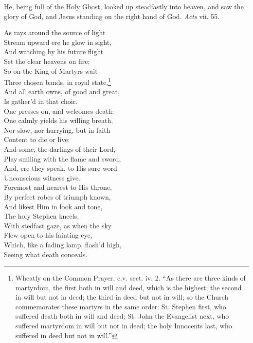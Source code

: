 
He, being full of the Holy Ghost, looked up steadfastly into heaven, and saw the glory of God, and Jesus standing on the right hand of God. \emph{Acts} vii. 55.

As rays around the source of light \\
 Stream upward ere he glow in sight, \\
 And watching by his future flight \\
 Set the clear heavens on fire; \\
 So on the King of Martyrs wait \\
 Three chosen bands, in royal state,\footnote{Wheatly on the Common Prayer, c.v. sect. iv. 2. “As there are three kinds of martyrdom, the first both in will and deed, which is the highest; the second in will but not in deed; the third in deed but not in will; so the Church commemorates these martyrs in the same order: St. Stephen first, who suffered death both in will and deed; St. John the Evangelist next, who suffered martyrdom in will but not in deed; the holy Innocents last, who suffered in deed but not in will.”} \\
 And all earth owns, of good and great, \\
 Is gather’d in that choir. \\
  One presses on, and welcomes death: \\
 One calmly yields his willing breath, \\
 Nor slow, nor hurrying, but in faith \\
 Content to die or live: \\
 And some, the darlings of their Lord, \\
 Play smiling with the flame and sword, \\
 And, ere they speak, to His sure word \\
 Unconscious witness give. \\
  Foremost and nearest to His throne, \\
 By perfect robes of triumph known, \\
 And likest Him in look and tone, \\
 The holy Stephen kneels, \\
 With stedfast gaze, as when the sky \\
 Flew open to his fainting eye, \\
 Which, like a fading lamp, flash’d high, \\
 Seeing what death conceals. \\
